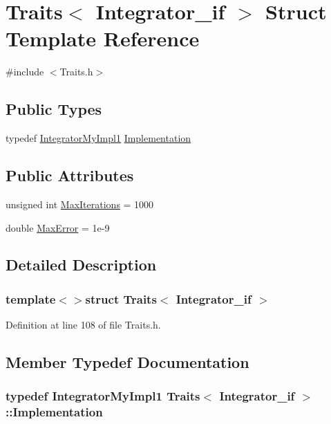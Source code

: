 \hypertarget{struct_traits_3_01_integrator__if_01_4}{\section{Traits$<$ Integrator\-\_\-if $>$ Struct Template Reference}
\label{struct_traits_3_01_integrator__if_01_4}
}


{\ttfamily \#include $<$Traits.\-h$>$}

\subsection*{Public Types}
\begin{DoxyCompactItemize}
\item 
typedef \hyperlink{class_integrator_my_impl1}{Integrator\-My\-Impl1} \hyperlink{struct_traits_3_01_integrator__if_01_4_a5bc6f81f74b024535b7d5ec3a5a414f0}{Implementation}
\end{DoxyCompactItemize}
\subsection*{Public Attributes}
\begin{DoxyCompactItemize}
\item 
unsigned int \hyperlink{struct_traits_3_01_integrator__if_01_4_a00ccc8b3ca58fdd91a0b40c59a02879b}{Max\-Iterations} = 1000
\item 
double \hyperlink{struct_traits_3_01_integrator__if_01_4_a32e086683b5e71dd7be4225d717d22a2}{Max\-Error} = 1e-\/9
\end{DoxyCompactItemize}


\subsection{Detailed Description}
\subsubsection*{template$<$$>$struct Traits$<$ Integrator\-\_\-if $>$}



Definition at line 108 of file Traits.\-h.



\subsection{Member Typedef Documentation}
\hypertarget{struct_traits_3_01_integrator__if_01_4_a5bc6f81f74b024535b7d5ec3a5a414f0}{
\subsubsection[{Implementation}]{\setlength{\rightskip}{0pt plus 5cm}typedef {\bf Integrator\-My\-Impl1} {\bf Traits}$<$ {\bf Integrator\-\_\-if} $>$\-::{\bf Implementation}}}\label{struct_traits_3_01_integrator__if_01_4_a5bc6f81f74b024535b7d5ec3a5a414f0}



